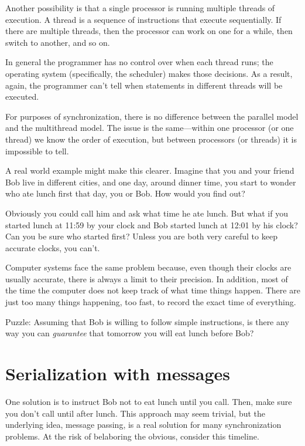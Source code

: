 Another possibility is that a single processor is running multiple
threads of execution.  A thread is a sequence of instructions
that execute sequentially.  If there are multiple threads, then
the processor can work on one for a while, then switch to
another, and so on.

In general the programmer has no control over when each thread runs;
the operating system (specifically, the scheduler) makes those
decisions.  As a result, again, the programmer can't tell when
statements in different threads will be executed.

For purposes of synchronization, there is no difference between the
parallel model and the multithread model.  The issue is the
same---within one processor (or one thread) we know the order of
execution, but between processors (or threads) it is impossible to
tell.

A real world example might make this clearer.  Imagine that you and
your friend Bob live in different cities, and one day, around dinner
time, you start to wonder who ate lunch first that day, you or Bob.
How would you find out?

Obviously you could call him and ask what time he ate lunch.  But what
if you started lunch at 11:59 by your clock and Bob started lunch at
12:01 by his clock?  Can you be sure who started first?  Unless you
are both very careful to keep accurate clocks, you can't.

Computer systems face the same problem because, even though their
clocks are usually accurate, there is always a limit to their
precision.  In addition, most of the time the computer does not keep
track of what time things happen.  There are just too many things
happening, too fast, to record the exact time of everything.

Puzzle: Assuming that Bob is willing to follow simple instructions, is
there any way you can {\em guarantee} that tomorrow you will eat lunch
before Bob?

\section {Serialization with messages}
\label{serialization}

One solution is to instruct Bob not to eat lunch until you call.
Then, make sure you don't call until after lunch.  This approach may
seem trivial, but the underlying idea, message passing, is a real
solution for many synchronization problems.
At the risk of belaboring the obvious, consider this timeline.

